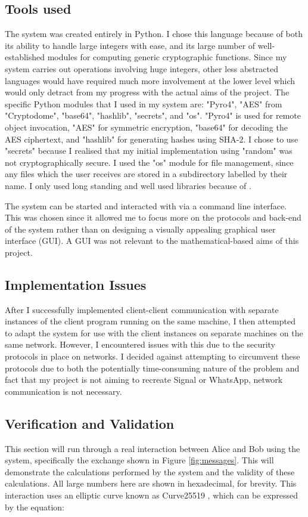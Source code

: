\documentclass[12pt,a4paper]{article}
\begin{document}
\subsection{Tools used} \noindent \label{Tools}
The system was created entirely in Python. 
I chose this language because of both its ability to handle large integers with ease, 
and its large number of well-established modules for computing generic cryptographic functions. 
Since my system carries out operations involving huge integers, other less abstracted languages would 
have required much more involvement at the lower level which would only detract from my progress with the actual aims of the project. 
The specific Python modules that I used in my system are: "Pyro4", "AES" from "Cryptodome", "base64", "hashlib", "secrets", and "os". 
"Pyro4" is used for remote object invocation, "AES" for symmetric encryption, "base64" for decoding the AES ciphertext, 
and "hashlib" for generating hashes using SHA-2. 
I chose to use "secrets" because I realised that my initial implementation using "random" was not cryptographically secure. 
I used the "os" module for file management, since any files which the user receives are stored 
in a subdirectory labelled by their name. 
I only used long standing and well used libraries because of \cite{ducklin2021python}. 

The system can be started and interacted with via a command line interface. 
This was chosen since it allowed me to focus 
more on the protocols and back-end of the system rather than on designing a visually appealing graphical user interface (GUI). 
A GUI was not relevant to the mathematical-based aims of this project. 


\subsection{Implementation Issues} \noindent \label{Implementation}
After I successfully implemented client-client communication with separate instances of the client program running on the 
same machine, I then attempted to adapt the system for use with the client instances on separate machines on the same network. 
However, I encountered issues with this due to the security protocols in place on networks. 
I decided against attempting to circumvent these protocols due to both the potentially 
time-consuming nature of the problem and fact that my project is not aiming 
to recreate Signal or WhatsApp, network communication is not necessary. 


\subsection{Verification and Validation} \noindent \label{Verification}
This section will run through a real interaction between Alice and Bob using the system, 
specifically the exchange shown in Figure \ref{fig:messages}. 
This will demonstrate the calculations performed by the system and the validity of these calculations. 
All large numbers here are shown in hexadecimal, for brevity. 
This interaction uses an elliptic curve known as Curve25519 \cite{10.1007/11745853_14}, 
which can be expressed by the equation: 
\end{document}
